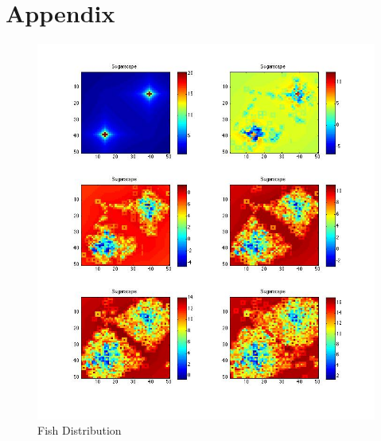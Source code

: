 \documentclass{article}
\begin{document}
\newpage

\section{Appendix}

\begin{figure}[ht]
	\begin{center}
		\includegraphics[scale=.75]{sugar.jpg}
		\caption{Fish Distribution}
	\end{center}
\end{figure} 
\end{document}
